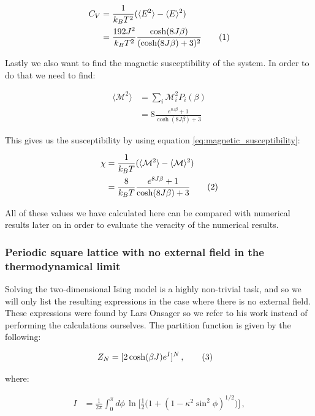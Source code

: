 \documentclass[reprint,english,notitlepage]{revtex4-1}  %
\newcommand\numberthis{\addtocounter{equation}{1}\tag{\theequation}}
\begin{document}
\begin{align*}
C_V &= \frac{1}{k_B T^2} ( \langle E^2 \rangle - \langle E \rangle^2) \\
&= \frac{192J^2}{k_B T^2} \frac{\cosh(8J\beta)}{(\cosh(8J\beta) + 3)^2} \numberthis \label{eq:2x2_heat_capacity}
\end{align*}

Lastly we also want to find the magnetic susceptibility of the system. In order to do that we need to find:

\begin{align*}
\langle \mathcal{M}^2 \rangle &= \sum\limits_i \mathcal{M}_i^2 P_i(\beta) \\
&= 8 \frac{e^{8J\beta} + 1}{\cosh(8J\beta) + 3}
\end{align*}

This gives us the susceptibility by using equation \eqref{eq:magnetic_susceptibility}:

\begin{align*}
\chi &= \frac{1}{k_B T} ( \langle \mathcal{M}^2 \rangle - \langle \mathcal{M} \rangle^2 ) \\
&= \frac{8}{k_B T} \frac{e^{8J \beta} + 1}{\cosh( 8J \beta) + 3} \numberthis \label{eq:2x2_susceptibility}
\end{align*}

All of these values we have calculated here can be compared with numerical results later on in order to evaluate the veracity of the numerical results.


\subsubsection{Periodic square lattice with no external field in the thermodynamical limit} \label{sec:II:A:ii}

Solving the two-dimensional Ising model is a highly non-trivial task, and so we will only list the resulting expressions in the case where there is no external field. These expressions were found by Lars Onsager so we refer to his work \citep{L.Onsager1944} instead of performing the calculations ourselves. The partition function is given by the following:

\begin{align*}
Z_N &= [2\cosh(\beta J) e^I ]^N \, , \numberthis \label{eq:LO_partition_function}
\end{align*}

where: 

\begin{align*}
I &= \frac{1}{2\pi} \int_0^\pi d\phi \, \ln \bigg[\frac{1}{2}\bigg( 1 + ( 1 - \kappa^2 \sin^2 \phi)^{1/2} \bigg) \bigg] \, , 
\end{align*}
\end{document}
